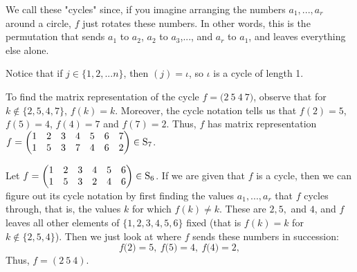 \documentclass[11pt,dvipsnames]{book}
\numberwithin{equation}{section} %
\numberwithin{figure}{section} %
\numberwithin{table}{section} %
\begin{document}
We call these "cycles" since, if you imagine arranging the numbers $a_{1},...,a_{r}$ around a circle, $f$ just rotates these numbers. In other words, this is the permutation that sends $a_{1}$ to $a_{2}$, $a_{2}$ to $a_{3}$,..., and $a_{r}$ to $a_{1}$, and leaves everything else alone. 

Notice that if $j\in \{1,2,...n\}$, then $(j)=\iota$, so $\iota$ is a cycle of length 1.


 \begin{example}
To find the matrix representation of the cycle $f=\big(2\ 5\ 4\ 7\big)$, observe that for $k\not\in \{2,5,4,7\}$, $f(k)=k$. Moreover, the cycle notation tells us that $f(2)=5$, $f(5)=4$, $f(4)=7$ and $f(7)=2$. Thus, $f$ has matrix representation $f=\left(\begin{matrix} %
1 & 2 & 3 & 4 & 5 & 6 & 7 \cr%
1 & 5 & 3 & 7 & 4 & 6 & 2 \cr%
\end{matrix}\right)\in\mathrm{S}_{7}$. 

\end{example}




 \begin{example}
Let $f=\left(\begin{matrix} %
1 & 2 & 3 & 4 & 5 & 6\cr%
1 & 5 & 3 & 2 & 4 & 6 \cr%
\end{matrix}\right)\in\mathrm{S}_6$.  If we are given that $f$ is a cycle, then we can figure out its cycle notation by first finding the values $a_{1},...,a_{r}$ that $f$ cycles through, that is, the values $k$ for which $f(k)\neq k$. These are $2,5,$ and $4$, and $f$ leaves all other elements of $\{1,2,3,4,5,6\}$
fixed (that is $f(k)=k$ for $k\not\in \{2,5,4\}$). Then we just look at where $f$ sends these numbers in succession:
$$
f\big(2\big)=5,\  f\big(5\big)=4,\  f\big(4\big)=2,
$$
Thus, $f=(2\ 5\ 4)$.
\end{example}
\end{document}
